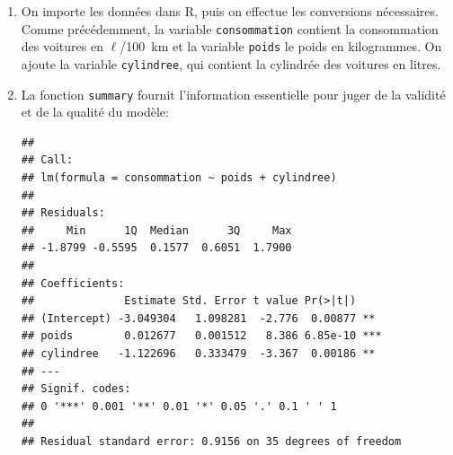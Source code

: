 \begin{solution}{3.8}
    \begin{enumerate}
    \item On importe les données dans \textsf{R}, puis on effectue les
      conversions nécessaires. Comme précédemment, la variable
      \texttt{consommation} contient la consommation des voitures en
      $\ell$/100~km et la variable \texttt{poids} le poids en
      kilogrammes. On ajoute la variable \texttt{cylindree}, qui
      contient la cylindrée des voitures en litres.
\begin{knitrout}
\color{fgcolor}\begin{kframe}
\begin{alltt}
 \hlkwb{<-} \hlstd{(}\hlstd{,}  \hlstd{=} \hlstd{)}
 \hlkwb{<-} \hlopt{/}\hlopt{$}
 \hlkwb{<-} \hlopt{$} \hlopt{*}  \hlopt{*} 
 \hlkwb{<-} \hlopt{$} \hlopt{*} \hlopt{^}\hlopt{/}
\end{alltt}
\end{kframe}
\end{knitrout}
    \item La fonction \texttt{summary} fournit l'information
      essentielle pour juger de la validité et de la qualité du
      modèle:
\begin{knitrout}
\color{fgcolor}\begin{kframe}
\begin{alltt}
 \hlkwb{<-}  \hlopt{~}  \hlopt{+} 
\end{alltt}
\begin{verbatim}
##
## Call:
## lm(formula = consommation ~ poids + cylindree)
##
## Residuals:
##     Min      1Q  Median      3Q     Max
## -1.8799 -0.5595  0.1577  0.6051  1.7900
##
## Coefficients:
##              Estimate Std. Error t value Pr(>|t|)
## (Intercept) -3.049304   1.098281  -2.776  0.00877 **
## poids        0.012677   0.001512   8.386 6.85e-10 ***
## cylindree   -1.122696   0.333479  -3.367  0.00186 **
## ---
## Signif. codes:
## 0 '***' 0.001 '**' 0.01 '*' 0.05 '.' 0.1 ' ' 1
##
## Residual standard error: 0.9156 on 35 degrees of freedom

\end{verbatim}
\end{kframe}
\end{knitrout}
\end{enumerate}
\end{solution}
